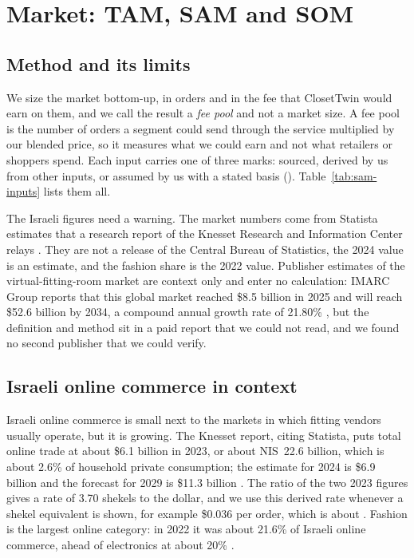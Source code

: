 \chapter{Market: TAM, SAM and SOM}\label{ch:market}

\section{Method and its limits}\label{sec:market-method}

We size the market bottom-up, in orders and in the fee that ClosetTwin would earn on them, and we call the result a \emph{fee pool} and not a market size. A fee pool is the number of orders a segment could send through the service multiplied by our blended price, so it measures what we could earn and not what retailers or shoppers spend. Each input carries one of three marks: sourced, derived by us from other inputs, or assumed by us with a stated basis (\ctlegend{}). Table~\ref{tab:sam-inputs} lists them all.

The Israeli figures need a warning. The market numbers come from Statista estimates that a research report of the Knesset Research and Information Center relays \cite{knesset_ric2025}. They are not a release of the Central Bureau of Statistics, the 2024 value is an estimate, and the fashion share is the 2022 value. Publisher estimates of the virtual-fitting-room market are context only and enter no calculation: IMARC Group reports that this global market reached \$8.5 billion in 2025 and will reach \$52.6 billion by 2034, a compound annual growth rate of 21.80\% \cite{imarc2026}, but the definition and method sit in a paid report that we could not read, and we found no second publisher that we could verify.

\section{Israeli online commerce in context}\label{sec:market-context}

Israeli online commerce is small next to the markets in which fitting vendors usually operate, but it is growing. The Knesset report, citing Statista, puts total online trade at about \$6.1 billion in 2023, or about NIS~22.6 billion, which is about 2.6\% of household private consumption; the estimate for 2024 is \$6.9 billion and the forecast for 2029 is \$11.3 billion \cite{knesset_ric2025}. The ratio of the two 2023 figures gives a rate of 3.70 shekels to the dollar, and we use this derived rate whenever a shekel equivalent is shown, for example \$0.036 per order, which is about . Fashion is the largest online category: in 2022 it was about 21.6\% of Israeli online commerce, ahead of electronics at about 20\% \cite{knesset_ric2025}.

